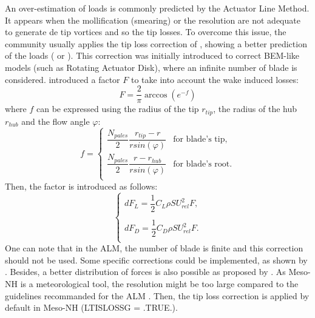 An over-estimation of loads is commonly predicted by the Actuator Line Method. It appears when the mollification (smearing) or the resolution are not adequate to generate de tip vortices and so the tip losses. 
To overcome this issue, the community usually applies the tip loss correction of \cite{glauert1935airplane}, showing a better prediction of the loads (\cite{mikkelsen2003actuator} or \cite{shen2005tip}). This correction was initially introduced to correct BEM-like models (such as  Rotating Actuator Disk), where an infinite number of blade is considered. \cite{glauert1935airplane} introduced a factor $F$ to take into account the wake induced losses:
\begin{equation}
F = \dfrac{2}{\pi} \arccos( e^{-f})
\end{equation}
where $f$ can be expressed using the radius of the tip $r_{tip}$, the radius of the hub $r_{hub}$ and the flow angle $\varphi$:
\begin{equation}
f=
\left\lbrace
\begin{array}{cc}
\dfrac{N_{pales}}{2} \dfrac{r_{tip}-r}{r sin(\varphi)}  & \mbox{for blade's tip,}\\
\dfrac{N_{pales}}{2} \dfrac{r-r_{hub}}{r sin(\varphi)}  & \mbox{for blade's root.} 
\\
\end{array}\right.
\end{equation}
Then, the factor is introduced as follows:
\begin{equation}	
\label{eq:ADR_tiploss}
\left\lbrace
\begin{array}{ccc}	
dF_{L} = \dfrac{1}{2} C_L \rho S U_{rel}^2 F,
\\   
\\
dF_{D} = \dfrac{1}{2} C_D \rho S U_{rel}^2 F.
\\
\end{array}\right.
\end{equation}	
One can note that in the ALM, the number of blade is finite and this correction should not be used. Some specific corrections could be implemented, as shown by \cite{breton2008study}. Besides, a better distribution of forces is also possible as proposed by \cite{churchfield2017advanced}. 
As Meso-NH is a meteorological tool, the resolution might be too large compared to the guidelines recommanded for the ALM \citep{jha2014guidelines}. Then, the tip loss correction is applied by default in Meso-NH (LTISLOSSG = .TRUE.).

